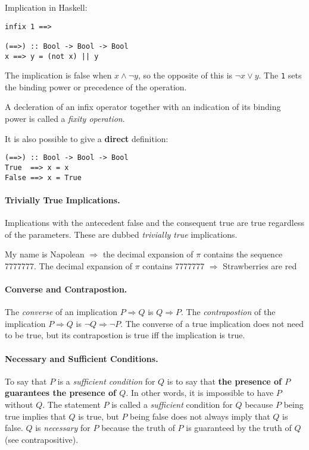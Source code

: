 \documentclass[11pt]{article}
\begin{document}
Implication in Haskell:
\begin{verbatim}
infix 1 ==>

(==>) :: Bool -> Bool -> Bool
x ==> y = (not x) || y
\end{verbatim}

The implication is false when $x \land \lnot y$, so the opposite of this is $\lnot x \lor y$. The \texttt{1} sets the binding power or precedence of the operation.

A decleration of an infix operator together with an indication of its binding power is called a \textit{fixity operation}.

It is also possible to give a \textbf{direct} definition:
\begin{verbatim}
(==>) :: Bool -> Bool -> Bool
True  ==> x = x
False ==> x = True
\end{verbatim}

\paragraph{Trivially True Implications.} Implications with the antecedent false and the consequent true are true regardless of the parameters. These are dubbed \textit{trivially true} implications.

My name is Napolean $\Rightarrow$ the decimal expansion of $\pi$ contains the sequence 7777777. \newline
The decimal expansion of $\pi$ contains 7777777 $\Rightarrow$ Strawberries are red

\paragraph{Converse and Contrapostion.} 

The \emph{converse} of an implication $P \Rightarrow Q$ is $Q \Rightarrow P$. The \emph{contrapostion} of the implication $P \Rightarrow Q$ is $\lnot Q \Rightarrow \lnot P$. The converse of a true implication does not need to be true, but its contrapostion is true iff the implication is true.

\paragraph{Necessary and Sufficient Conditions.} To say that $P$ is a \textit{sufficient condition} for $Q$ is to say that \textbf{the presence of $P$ guarantees the presence of $Q$}. In other words, it is impossible to have $P$ without $Q$. The statement $P$ is called a \emph{sufficient} condition for $Q$ because $P$ being true implies that $Q$ is true, but $P$ being false does not always imply that $Q$ is false. \newline $Q$ is \emph{necessary} for $P$ because the truth of $P$ is guaranteed by the truth of $Q$ (see contrapositive).
\end{document}
